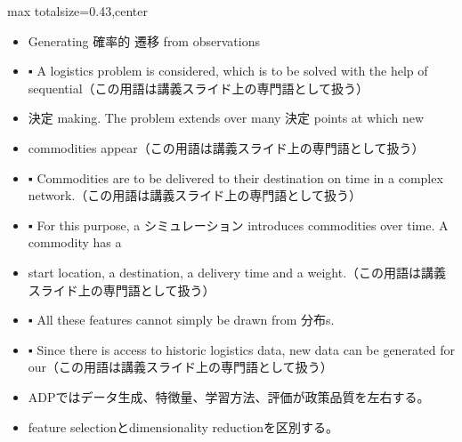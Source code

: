 \clearpage
{}
\begin{minipage}[t]{0.405\textwidth}
\begin{adjustbox}{max totalsize={\textwidth}{0.43\textheight},center}
\begin{minipage}{\textwidth}\scriptsize
{}\begin{itemize}
\item Generating 確率的 遷移 from observations
\item ▪ A logistics problem is considered, which is to be solved with the help of sequential（この用語は講義スライド上の専門語として扱う）
\item 決定 making. The problem extends over many 決定 points at which new
\item commodities appear（この用語は講義スライド上の専門語として扱う）
\item ▪ Commodities are to be delivered to their destination on time in a complex network.（この用語は講義スライド上の専門語として扱う）
\item ▪ For this purpose, a シミュレーション introduces commodities over time. A commodity has a
\item start location, a destination, a delivery time and a weight.（この用語は講義スライド上の専門語として扱う）
\item ▪ All these features cannot simply be drawn from 分布s.
\item ▪ Since there is access to historic logistics data, new data can be generated for our（この用語は講義スライド上の専門語として扱う）
\end{itemize}\begin{itemize}
\item ADPではデータ生成、特徴量、学習方法、評価が政策品質を左右する。
\item feature selectionとdimensionality reductionを区別する。
\end{itemize}
\end{minipage}
\end{adjustbox}
\end{minipage}\hfill
